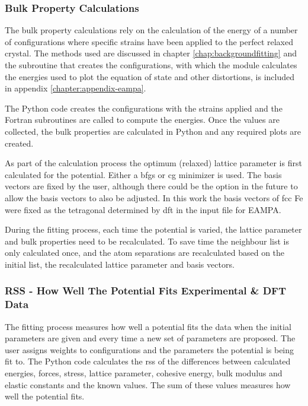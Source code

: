 \subsubsection{Bulk Property Calculations}

The bulk property calculations rely on the calculation of the energy of a number of configurations where specific strains have been applied to the perfect relaxed crystal.  The methods used are discussed in chapter \ref{chap:backgroundfitting} and the subroutine that creates the configurations, with which the module calculates the energies used to plot the equation of state and other distortions, is included in appendix \ref{chapter:appendix-eampa}.

The Python code creates the configurations with the strains applied and the Fortran subroutines are called to compute the energies.  Once the values are collected, the bulk properties are calculated in Python and any required plots are created.

As part of the calculation process the optimum (relaxed) lattice parameter is first calculated for the potential.  Either a \acrshort{bfgs} or \acrshort{cg} minimizer is used.  The basis vectors are fixed by the user, although there could be the option in the future to allow the basis vectors to also be adjusted.  In this work the basis vectors of \acrshort{fcc} \Gls{Fe} were fixed as the tetragonal determined by \acrshort{dft} in the input file for EAMPA.  

During the fitting process, each time the potential is varied, the lattice parameter and bulk properties need to be recalculated.  To save time the neighbour list is only calculated once, and the atom separations are recalculated based on the initial list, the recalculated lattice parameter and basis vectors.


\subsubsection{RSS - How Well The Potential Fits Experimental \& DFT Data}

The fitting process measures how well a potential fits the data when the initial parameters are given and every time a new set of parameters are proposed.  The user assigns weights to configurations and the parameters the potential is being fit to.  The Python code calculates the \acrfull{rss} of the differences between calculated energies, forces, stress, lattice parameter, cohesive energy, bulk modulus and elastic constants and the known values.  The sum of these values measures how well the potential fits.


